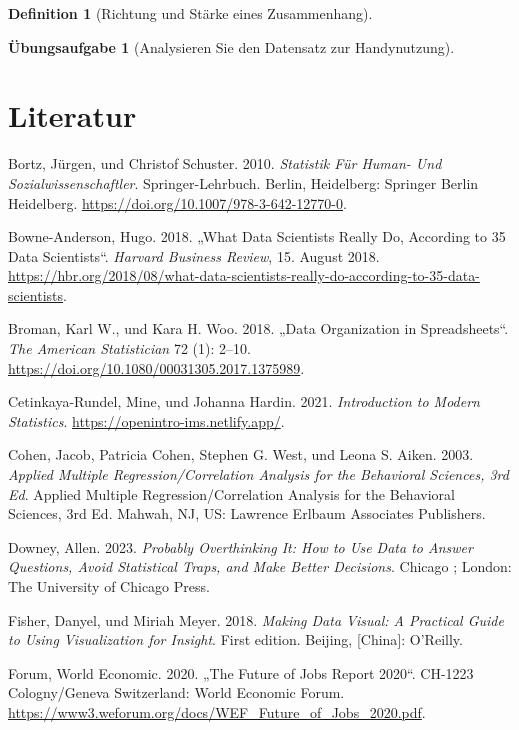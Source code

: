 \documentclass[
  a4paper,
  DIV=11]{scrreprt}
\newlength{\cslhangindent}
\newenvironment{CSLReferences}[2] %
 {\begin{list}{}{%
  \setlength{\itemindent}{0pt}
  \setlength{\leftmargin}{0pt}
  \setlength{\parsep}{0pt}
  \ifodd #1
   \setlength{\leftmargin}{\cslhangindent}
   \setlength{\itemindent}{-1\cslhangindent}
  \fi
  \setlength{\itemsep}{#2\baselineskip}}}
 {\end{list}}
\theoremstyle{definition}
\newtheorem{exercise}{Übungsaufgabe}[chapter]
\theoremstyle{definition}
\theoremstyle{definition}
\newtheorem{definition}{Definition}[chapter]
\theoremstyle{remark}
\begin{document}
\begin{definition}[Richtung und Stärke eines
Zusammenhang]
\begin{exercise}[Analysieren Sie den Datensatz zur
Handynutzung]
\chapter*{Literatur}\label{literatur-9}


\label{refs}
\begin{CSLReferences}{1}{0}
Bortz, Jürgen, und Christof Schuster. 2010. \emph{Statistik Für {Human-}
Und {Sozialwissenschaftler}}. Springer-{Lehrbuch}. Berlin, Heidelberg:
Springer Berlin Heidelberg.
\url{https://doi.org/10.1007/978-3-642-12770-0}.

Bowne-Anderson, Hugo. 2018. {„What {Data Scientists Really Do},
{According} to 35 {Data Scientists}``}. \emph{Harvard Business Review},
15. August 2018.
\url{https://hbr.org/2018/08/what-data-scientists-really-do-according-to-35-data-scientists}.

Broman, Karl W., und Kara H. Woo. 2018. {„Data {Organization} in
{Spreadsheets}``}. \emph{The American Statistician} 72 (1): 2--10.
\url{https://doi.org/10.1080/00031305.2017.1375989}.

Cetinkaya-Rundel, Mine, und Johanna Hardin. 2021. \emph{Introduction to
{Modern Statistics}}. \url{https://openintro-ims.netlify.app/}.

Cohen, Jacob, Patricia Cohen, Stephen G. West, und Leona S. Aiken. 2003.
\emph{Applied Multiple Regression/Correlation Analysis for the
Behavioral Sciences, 3rd Ed}. Applied Multiple Regression/Correlation
Analysis for the Behavioral Sciences, 3rd Ed. Mahwah, NJ, US: Lawrence
Erlbaum Associates Publishers.

Downey, Allen. 2023. \emph{Probably Overthinking It: How to Use Data to
Answer Questions, Avoid Statistical Traps, and Make Better Decisions}.
Chicago ; London: The University of Chicago Press.

Fisher, Danyel, und Miriah Meyer. 2018. \emph{Making Data Visual: A
Practical Guide to Using Visualization for Insight}. First edition.
Beijing, {[}China{]}: O'Reilly.

Forum, World Economic. 2020. {„The {Future} of {Jobs Report} 2020``}.
CH-1223 Cologny/Geneva Switzerland: World Economic Forum.
\url{https://www3.weforum.org/docs/WEF_Future_of_Jobs_2020.pdf}.


\end{CSLReferences}
\end{exercise}
\end{definition}
\end{document}
